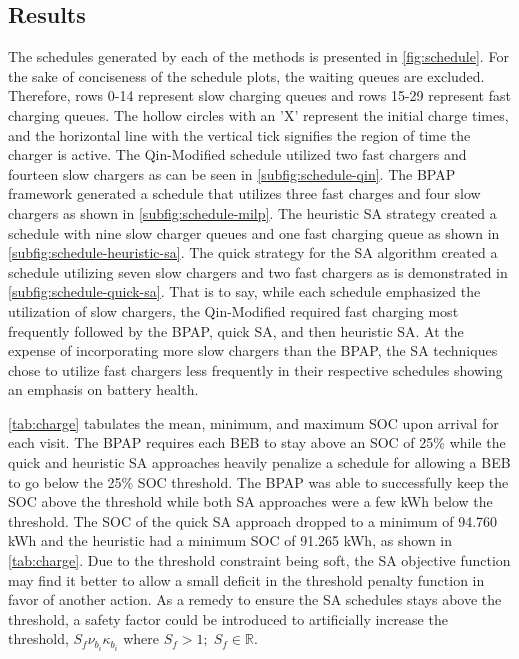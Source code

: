 \documentclass[ee,thesis]{usuthesis}
\begin{document}
\subsection{Results}
\label{sec:sa-results}
The schedules generated by each of the methods is presented in \ref{fig:schedule}. For the sake of conciseness of the
schedule plots, the waiting queues are excluded. Therefore, rows 0-14 represent slow charging queues and rows 15-29
represent fast charging queues. The hollow circles with an 'X' represent the initial charge times, and the horizontal
line with the vertical tick signifies the region of time the charger is active. The Qin-Modified schedule utilized two
fast chargers and fourteen slow chargers as can be seen in \ref{subfig:schedule-qin}. The BPAP framework generated a
schedule that utilizes three fast charges and four slow chargers as shown in \ref{subfig:schedule-milp}. The heuristic
SA strategy created a schedule with nine slow charger queues and one fast charging queue as shown in
\ref{subfig:schedule-heuristic-sa}. The quick strategy for the SA algorithm created a schedule utilizing seven slow
chargers and two fast chargers as is demonstrated in \ref{subfig:schedule-quick-sa}. That is to say, while each schedule
emphasized the utilization of slow chargers, the Qin-Modified required fast charging most frequently followed by the
BPAP, quick SA, and then heuristic SA. At the expense of incorporating more slow chargers than the BPAP, the SA
techniques chose to utilize fast chargers less frequently in their respective schedules showing an emphasis on battery
health.

\ref{tab:charge} tabulates the mean, minimum, and maximum SOC upon arrival for each visit. The BPAP requires each BEB to stay
above an SOC of 25\% while the quick and heuristic SA approaches heavily penalize a schedule for allowing a BEB to go
below the 25\% SOC threshold. The BPAP was able to successfully keep the SOC above the threshold while both SA approaches
were a few kWh below the threshold. The SOC of the quick SA approach dropped to a minimum of 94.760 kWh and the
heuristic had a minimum SOC of 91.265 kWh, as shown in \ref{tab:charge}. Due to the threshold constraint being soft, the SA
objective function may find it better to allow a small deficit in the threshold penalty function in favor of another
action. As a remedy to ensure the SA schedules stays above the threshold, a safety factor could be introduced to
artificially increase the threshold, \(S_f \nu_{b_i}\kappa_{b_i}\) where \(S_f > 1;\; S_f \in \mathbb{R}\).
\end{document}
